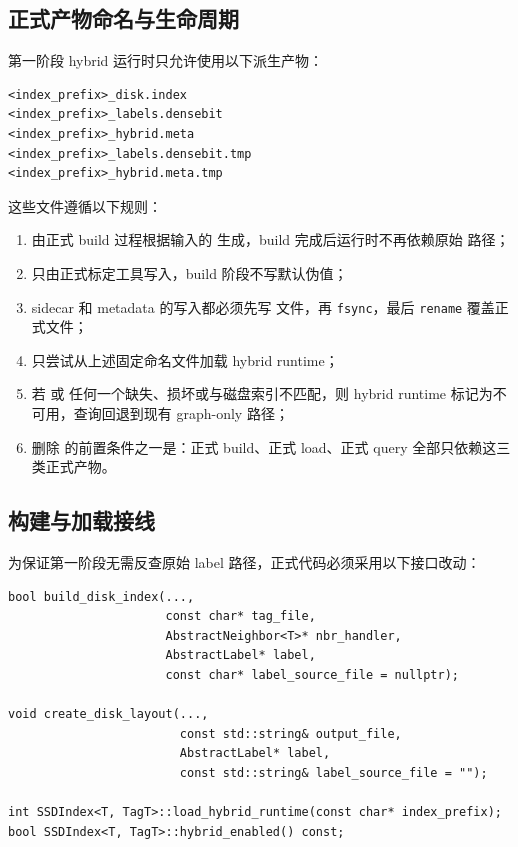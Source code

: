\documentclass[UTF8]{ctexart}
\begin{document}
\subsection{正式产物命名与生命周期}
第一阶段 hybrid 运行时只允许使用以下派生产物：

\begin{verbatim}
<index_prefix>_disk.index
<index_prefix>_labels.densebit
<index_prefix>_hybrid.meta
<index_prefix>_labels.densebit.tmp
<index_prefix>_hybrid.meta.tmp
\end{verbatim}

这些文件遵循以下规则：

\begin{enumerate}
\item {} 由正式 build 过程根据输入的  生成，build 完成后运行时不再依赖原始  路径；
\item {} 只由正式标定工具写入，build 阶段不写默认伪值；
\item sidecar 和 metadata 的写入都必须先写  文件，再 \texttt{fsync}，最后 \texttt{rename} 覆盖正式文件；
\item {} 只尝试从上述固定命名文件加载 hybrid runtime；
\item 若  或  任何一个缺失、损坏或与磁盘索引不匹配，则 hybrid runtime 标记为不可用，查询回退到现有 graph-only 路径；
\item 删除  的前置条件之一是：正式 build、正式 load、正式 query 全部只依赖这三类正式产物。
\end{enumerate}

\subsection{构建与加载接线}
为保证第一阶段无需反查原始 label 路径，正式代码必须采用以下接口改动：

\begin{verbatim}
bool build_disk_index(...,
					  const char* tag_file,
					  AbstractNeighbor<T>* nbr_handler,
					  AbstractLabel* label,
					  const char* label_source_file = nullptr);

void create_disk_layout(...,
						const std::string& output_file,
						AbstractLabel* label,
						const std::string& label_source_file = "");

int SSDIndex<T, TagT>::load_hybrid_runtime(const char* index_prefix);
bool SSDIndex<T, TagT>::hybrid_enabled() const;
\end{verbatim}
\end{document}
